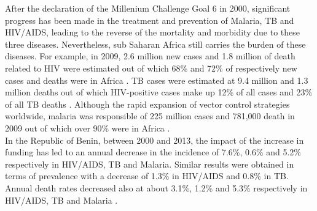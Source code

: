After the declaration of the Millenium Challenge Goal 6 in 2000, significant progress has been made in the treatment and prevention of Malaria, TB and HIV/AIDS, leading to the reverse of the mortality and morbidity due to these three diseases. Nevertheless, sub Saharan Africa still carries the burden of these diseases. For example, in 2009, 2.6 million new cases and 1.8 million of death related to HIV were estimated out of which 68\% and 72\% of respectively new cases and deaths were in Africa \cite{joint_united_nations_programme_on_hiv/aids_global_2010}. TB cases were estimated at 9.4 million and 1.3 million deaths out of which HIV-positive cases make up 12\% of all cases and 23\% of all TB deaths \cite{world_health_organization_global_2010}. Although the rapid expansion of vector control strategies worldwide, malaria was responsible of 225 million cases and 781,000 death in 2009 out of which over 90\% were in Africa \cite{world_health_organization_world_2012}. \\
In the Republic of Benin, between 2000 and 2013, the impact of the increase in funding has led to an annual decrease in the incidence of 7.6\%, 0.6\% and 5.2\% respectively in HIV/AIDS, TB and Malaria. Similar results were obtained in terms of prevalence with a decrease of 1.3\% in HIV/AIDS and 0.8\% in TB. Annual death rates decreased also at about 3.1\%, 1.2\% and 5.3\% respectively in HIV/AIDS, TB and Malaria \cite{world_health_organization_world_2012,joint_united_nations_programme_on_hiv/aids_global_2010,world_health_organization_global_2010}.\\
